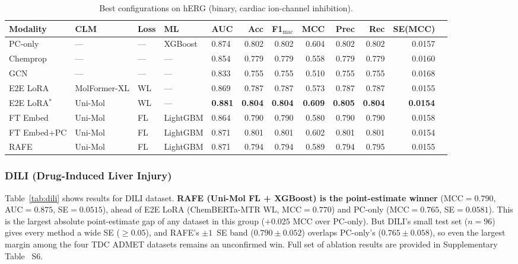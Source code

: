\documentclass[final,1p,times]{elsarticle}
\begin{document}
\begin{table}[!ht]
\centering
\caption{Best configurations on hERG (binary, cardiac ion-channel inhibition).}
\label{tab:herg}
\begin{adjustbox}{max width=\textwidth}
\begin{tabular}{lllllrrrrrrr}
\toprule
Modality & CLM & Loss & ML & AUC & Acc & F1$_\text{mac}$ & MCC & Prec & Rec & SE(MCC) \\
\midrule
PC-only     & --- & --- & XGBoost  & 0.874 & 0.802 & 0.802 & 0.604 & 0.802 & 0.802 & 0.0157 \\
Chemprop    & --- & --- & ---      & 0.854 & 0.779 & 0.779 & 0.558 & 0.779 & 0.779 & 0.0160 \\
GCN         & --- & --- & ---      & 0.833 & 0.755 & 0.755 & 0.510 & 0.755 & 0.755 & 0.0168 \\
\midrule
E2E LoRA    & MolFormer-XL & WL & --- & 0.869 & 0.787 & 0.787 & 0.573 & 0.787 & 0.787 & 0.0155 \\
E2E LoRA$^*$& Uni-Mol      & WL & --- & \textbf{0.881} & \textbf{0.804} & \textbf{0.804} & \textbf{0.609} & \textbf{0.805} & \textbf{0.804} & \textbf{0.0154} \\
\midrule
FT Embed    & Uni-Mol & FL & LightGBM & 0.864 & 0.790 & 0.790 & 0.580 & 0.790 & 0.790 & 0.0158 \\
FT Embed+PC & Uni-Mol & FL & LightGBM & 0.871 & 0.801 & 0.801 & 0.602 & 0.801 & 0.801 & 0.0154 \\
RAFE        & Uni-Mol & FL & LightGBM & 0.871 & 0.794 & 0.794 & 0.589 & 0.794 & 0.795 & 0.0155 \\
\bottomrule
\end{tabular}
\end{adjustbox}
\end{table}

\subsubsection{DILI (Drug-Induced Liver Injury)}
Table~\ref{tab:dili} shows results for DILI dataset. \textbf{RAFE (Uni-Mol FL + XGBoost) is the point-estimate winner} (MCC$=0.790$, AUC$=0.875$, SE$=0.0515$), ahead of E2E LoRA (ChemBERTa-MTR WL, MCC$=0.770$) and PC-only (MCC$=0.765$, SE$=0.0581$). This is the largest absolute point-estimate gap of any dataset in this group ($+0.025$ MCC over PC-only). But DILI's small test set ($n=96$) gives every method a wide SE ($\ge0.05$), and RAFE's $\pm1$~SE band ($0.790\pm0.052$) overlaps PC-only's ($0.765\pm0.058$), so even the largest margin among the four TDC ADMET datasets remains an unconfirmed win. Full set of ablation results are provided in Supplementary Table ~S6.
\end{document}
